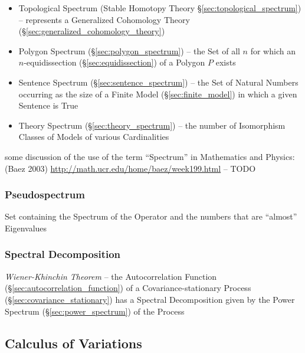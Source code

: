 {\begin{itemize}
  \item Topological Spectrum (Stable Homotopy Theory
    \S\ref{sec:topological_spectrum}) -- represents a Generalized Cohomology
    Theory (\S\ref{sec:generalized_cohomology_theory})

  \item Polygon Spectrum (\S\ref{sec:polygon_spectrum}) -- the Set of all $n$
    for which an $n$-equidissection (\S\ref{sec:equidissection}) of a Polygon
    $P$ exists

  \item Sentence Spectrum (\S\ref{sec:sentence_spectrum}) -- the Set of Natural
    Numbers occurring as the size of a Finite Model
    (\S\ref{sec:finite_model}) in which a given Sentence is True
  \item Theory Spectrum (\S\ref{sec:theory_spectrum}) -- the number of
    Isomorphism Classes of Models of various Cardinalities
\end{itemize}

some discussion of the use of the term ``Spectrum'' in Mathematics and
Physics: (Baez 2003) \url{http://math.ucr.edu/home/baez/week199.html}
-- TODO



\subsubsection{Pseudospectrum}\label{sec:pseudospectrum}

Set containing the Spectrum of the Operator and the numbers that are ``almost''
Eigenvalues



\subsubsection{Spectral Decomposition}\label{sec:spectral_decomposition}

\emph{Wiener-Khinchin Theorem} -- the Autocorrelation Function
(\S\ref{sec:autocorrelation_function}) of a Covariance-stationary Process
(\S\ref{sec:covariance_stationary}) has a Spectral Decomposition given by the
Power Spectrum (\S\ref{sec:power_spectrum}) of the Process



\subsection{Calculus of Variations}\label{sec:variational_calculus}

}

